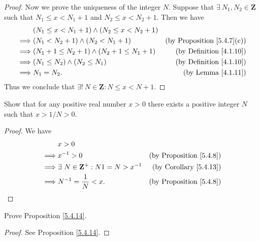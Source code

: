 \begin{proof}
    Now we prove the uniqueness of the integer \(N\).
    Suppose that \(\exists\ N_1, N_2 \in \mathbf{Z}\) such that \(N_1 \leq x < N_1 + 1\) and \(N_2 \leq x < N_2 + 1\).
    Then we have
    \begin{align*}
                 & (N_1 \leq x < N_1 + 1) \land (N_2 \leq x < N_2 + 1)                                          \\
        \implies & (N_1 < N_2 + 1) \land (N_2 < N_1 + 1)               & \text{(by Proposition \ref{5.4.7}(c))} \\
        \implies & (N_1 + 1 \leq N_2 + 1) \land (N_2 + 1 \leq N_1 + 1) & \text{(by Definition \ref{4.1.10})}    \\
        \implies & (N_1 \leq N_2) \land (N_2 \leq N_1)                 & \text{(by Definition \ref{4.1.10})}    \\
        \implies & N_1 = N_2.                                          & \text{(by Lemma \ref{4.1.11})}
    \end{align*}
    Thus we conclude that \(\exists!\ N \in \mathbf{Z} : N \leq x < N + 1\).
\end{proof}

\begin{exercise}\label{ex 5.4.4}
    Show that for any positive real number \(x > 0\) there exists a positive integer \(N\) such that \(x > 1 / N > 0\).
\end{exercise}

\begin{proof}
    We have
    \begin{align*}
                 & x > 0                                                                               \\
        \implies & x^{-1} > 0                                    & \text{(by Proposition \ref{5.4.8})} \\
        \implies & \exists\ N \in \mathbf{Z}^+ : N1 = N > x^{-1} & \text{(by Corollary \ref{5.4.13})}  \\
        \implies & N^{-1} = \frac{1}{N} < x.                     & \text{(by Proposition \ref{5.4.8})}
    \end{align*}
\end{proof}

\begin{exercise}\label{ex 5.4.5}
    Prove Proposition \ref{5.4.14}.
\end{exercise}

\begin{proof}
    See Proposition \ref{5.4.14}.
\end{proof}

